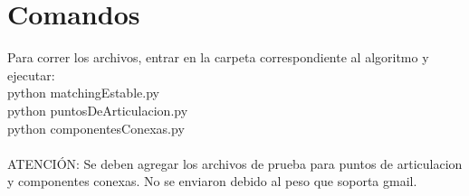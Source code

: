 \documentclass{article}
\begin{document}
    \section{Comandos}
        Para correr los archivos, entrar en la carpeta correspondiente al algoritmo y ejecutar: \\
        python matchingEstable.py \\
        python puntosDeArticulacion.py \\
        python componentesConexas.py \\ \\
        ATENCIÓN: Se deben agregar los archivos de prueba para puntos de articulacion y componentes
        conexas. No se enviaron debido al peso que soporta gmail.
\end{document}

